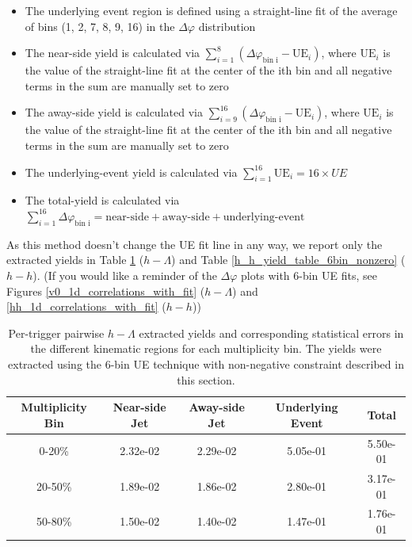\documentclass[ALICE,manyauthors]{ALICE_analysis_notes}
\begin{document}
\begin{itemize}
\item The underlying event region is defined using a straight-line fit of the average of bins (1, 2, 7, 8, 9, 16) in the $\Delta\varphi$ distribution
\item The near-side yield is calculated via $\sum_{i=1}^{8} (\Delta\varphi_\text{bin i} - \text{UE}_i)$, where $\text{UE}_i$ is the value of the straight-line fit at the center of the ith bin and all negative terms in the sum are manually set to zero
\item The away-side yield is calculated via $\sum_{i=9}^{16} (\Delta\varphi_\text{bin i} - \text{UE}_i)$, where $\text{UE}_i$ is the value of the straight-line fit at the center of the ith bin and all negative terms in the sum are manually set to zero
\item The underlying-event yield is calculated via $\sum_{i=1}^{16} \text{UE}_i = 16 \times UE$
\item The total-yield is calculated via $\sum_{i=1}^{16} \Delta\varphi_\text{bin i} = \text{near-side} + \text{away-side} + \text{underlying-event}$
\end{itemize}

As this method doesn't change the UE fit line in any way, we report only the extracted yields in Table \ref{h_lambda_yield_table_6bin_nonzero} ($h-\Lambda$) and Table \ref{h_h_yield_table_6bin_nonzero} ($h-h$). (If you would like a reminder of the $\Delta\varphi$ plots with 6-bin UE fits, see Figures \ref{v0_1d_correlations_with_fit} ($h-\Lambda$) and \ref{hh_1d_correlations_with_fit} ($h-h$))

	
\begin{table}[h!]
\centering
\begin{tabular}{| c | c | c | c | c | }
\hline
Multiplicity Bin & Near-side Jet & Away-side Jet & Underlying Event & Total  \\
\hline
	
0-20\% & 2.32e-02  & 2.29e-02  & 5.05e-01 & 5.50e-01 \\
20-50\% & 1.89e-02 & 1.86e-02  & 2.80e-01 & 3.17e-01 \\
50-80\% & 1.50e-02 & 1.40e-02  & 1.47e-01 & 1.76e-01 \\
	
\hline
\end{tabular}
\caption{Per-trigger pairwise $h-\Lambda$ extracted yields and corresponding statistical errors in the different kinematic regions for each multiplicity bin. The yields were extracted using the 6-bin UE technique with non-negative constraint described in this section.}
\label{h_lambda_yield_table_6bin_nonzero}
\end{table}
	
\end{document}
